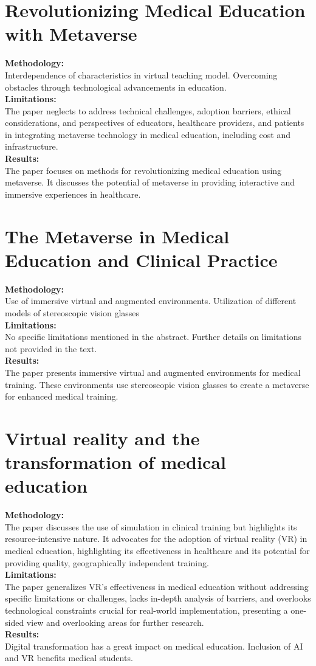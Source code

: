 \section{Revolutionizing Medical Education with Metaverse\cite{baskar2022revolutionizing}\cite{JournalArticle9}}
\textbf{Methodology:}\\Interdependence of characteristics in virtual teaching model.
Overcoming obstacles through technological advancements in education.\\
\textbf{Limitations:}\\The paper neglects to address technical challenges, adoption barriers, ethical considerations, and perspectives of educators, healthcare providers, and patients in integrating metaverse technology in medical education, including cost and infrastructure.\\
\textbf{Results:}\\ The paper focuses on methods for revolutionizing medical education using metaverse. It discusses the potential of metaverse in providing interactive and immersive experiences in healthcare.
\section{The Metaverse in Medical Education and Clinical Practice\cite{juan2023metaverse}}
\textbf{Methodology:}\\Use of immersive virtual and augmented environments.
Utilization of different models of stereoscopic vision glasses\\
\textbf{Limitations:}\\No specific limitations mentioned in the abstract. Further details on limitations not provided in the text.\\
\textbf{Results:}\\The paper presents immersive virtual and augmented environments for medical training. These environments use stereoscopic vision glasses to create a metaverse for enhanced medical training.
\section{Virtual reality and the transformation of medical education\cite{pottle2019virtual}}
\textbf{Methodology:}\\The paper discusses the use of simulation in clinical training but highlights its resource-intensive nature. It advocates for the adoption of virtual reality (VR) in medical education, highlighting its effectiveness in healthcare and its potential for providing quality, geographically independent training.\\
\textbf{Limitations:}\\
The paper generalizes VR's effectiveness in medical education without addressing specific limitations or challenges, lacks in-depth analysis of barriers, and overlooks technological constraints crucial for real-world implementation, presenting a one-sided view and overlooking areas for further research.\\
\textbf{Results:}\\Digital transformation has a great impact on medical education.
Inclusion of AI and VR benefits medical students.
